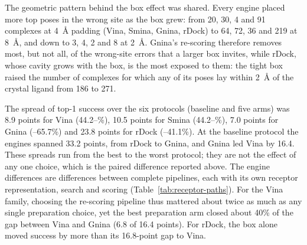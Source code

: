 The geometric pattern behind the box effect was shared. Every engine placed more top poses in
the wrong site as the box grew: from 20, 30, 4 and 91 complexes at \SI{4}{\angstrom}
padding (Vina, Smina, Gnina, rDock) to 64, 72, 36 and 219 at \SI{8}{\angstrom}, and down
to 3, 4, 2 and 8 at \SI{2}{\angstrom}. Gnina's re-scoring therefore removes most, but not
all, of the wrong-site errors that a larger box invites, while rDock, whose cavity grows
with the box, is the most exposed to them: the tight box raised the number of complexes for
which any of its poses lay within \SI{2}{\angstrom} of the crystal ligand from 186 to 271.

The spread of top-1 success over the six protocols (baseline and five arms) was 8.9 points for Vina
(44.2--\%), 10.5 points for Smina (44.2--\%), 7.0 points for Gnina
(--65.7\%) and 23.8 points for rDock (--41.1\%). At the baseline protocol the
engines spanned 33.2 points, from rDock to Gnina, and Gnina led Vina by 16.4. These spreads
run from the best to the worst protocol; they are not the effect of any one choice, which is
the paired difference reported above. The engine differences are differences between complete
pipelines, each with its own receptor representation, search and scoring
(Table~\ref{tab:receptor-paths}). For the Vina family, choosing the re-scoring pipeline
thus mattered about twice as much as any single preparation choice, yet the best preparation arm closed about 40\% of the gap between Vina
and Gnina (6.8 of 16.4 points). For rDock, the box alone moved success by more than its
16.8-point gap to Vina.

